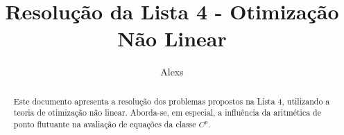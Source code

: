\documentclass[preprint,12pt]{elsarticle}
\begin{document}
\begin{frontmatter}



\title{Resolu\c{c}\~ao da Lista 4 - Otimiza\c{c}\~ao N\~ao Linear}


\author[inst1]{Alexs}


\begin{abstract}
Este documento apresenta a resolu\c{c}\~ao dos problemas propostos na Lista 4, utilizando a teoria de otimiza\c{c}\~ao n\~ao linear. Aborda-se, em especial, a influ\^encia da aritm\'etica de ponto flutuante na avalia\c{c}\~ao de equa\c{c}\~oes da classe $C^p$.
\end{abstract}



\end{frontmatter}
\end{document}
